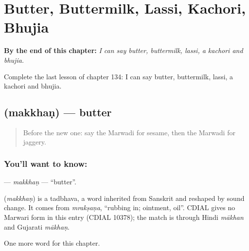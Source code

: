 
\chapter{Butter, Buttermilk, Lassi, Kachori, Bhujia}
\label{ch:mw-butter-buttermilk-lassi-kachori-bhujia}

\begin{chapteropening}
\textbf{By the end of this chapter:} \emph{I can say butter, buttermilk, lassi, a kachori and bhujia.}

Complete the last lesson of chapter 134: I can say butter, buttermilk, lassi, a kachori and bhujia.
\end{chapteropening}

\section[\texorpdfstring{\mw{मक्खण} (makkhaṇ)}{मक्खण (makkhaṇ)}]{ (makkhaṇ) — butter}

\label{lesson:MW-C134-makkhan}



\begin{quote}
Before the new one: say the Marwadi for sesame, then the Marwadi for jaggery.
\end{quote}

\subsection*{You'll want to know: }
\textbf{} — \emph{makkhaṇ} — \textquotedblleft{}butter\textquotedblright{}.

\begin{cousinweb}
\textbf{} (\emph{makkhaṇ}) is a tadbhava, a word inherited from Sanskrit and reshaped by sound change. It comes from \emph{mrakṣaṇa}, \textquotedblleft{}rubbing in; ointment, oil\textquotedblright{}. CDIAL gives no Marwari form in this entry (CDIAL 10378); the match is through Hindi \emph{mākhan} and Gujarati \emph{mākhaṇ}.
\end{cousinweb}

\begin{grammarlens}[title={What you've built}]
One more word for this chapter.
\end{grammarlens}

